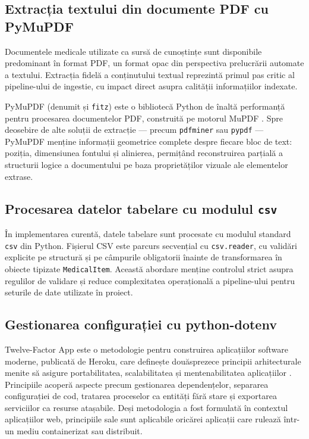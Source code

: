 \documentclass[12pt, a4paper, oneside, romanian]{teza-upb}
\begin{document}
\subsection{Extracția textului din documente PDF cu PyMuPDF}

Documentele medicale utilizate ca sursă de cunoștințe sunt disponibile predominant în format PDF, un format opac din perspectiva prelucrării automate a textului. Extracția fidelă a conținutului textual reprezintă primul pas critic al pipeline-ului de ingestie, cu impact direct asupra calității informațiilor indexate.

PyMuPDF (denumit și \texttt{fitz}) este o bibliotecă Python de înaltă performanță pentru procesarea documentelor PDF, construită pe motorul MuPDF \cite{pymupdf_doc}. Spre deosebire de alte soluții de extracție — precum \texttt{pdfminer} sau \texttt{pypdf} — PyMuPDF menține informații geometrice complete despre fiecare bloc de text: poziția, dimensiunea fontului și alinierea, permițând reconstruirea parțială a structurii logice a documentului pe baza proprietăților vizuale ale elementelor extrase.

\subsection{Procesarea datelor tabelare cu modulul \texttt{csv}}

În implementarea curentă, datele tabelare sunt procesate cu modulul standard
\texttt{csv} din Python. Fișierul CSV este parcurs secvențial cu \texttt{csv.reader}, cu
validări explicite pe structură și pe câmpurile obligatorii înainte de
transformarea în obiecte tipizate \texttt{MedicalItem}. Această abordare menține
controlul strict asupra regulilor de validare și reduce complexitatea
operațională a pipeline-ului pentru seturile de date utilizate în proiect.
\subsection{Gestionarea configurației cu python-dotenv}

Twelve-Factor App este o metodologie pentru construirea aplicațiilor software 
moderne, publicată de Heroku, care definește douăsprezece principii arhitecturale 
menite să asigure portabilitatea, scalabilitatea și mentenabilitatea aplicațiilor 
\cite{twelvefactor}. Principiile acoperă aspecte precum gestionarea dependențelor, 
separarea configurației de cod, tratarea proceselor ca entități fără stare și 
exportarea serviciilor ca resurse atașabile. Deși metodologia a fost formulată 
în contextul aplicațiilor web, principiile sale sunt aplicabile oricărei aplicații 
care rulează într-un mediu containerizat sau distribuit.
\end{document}
